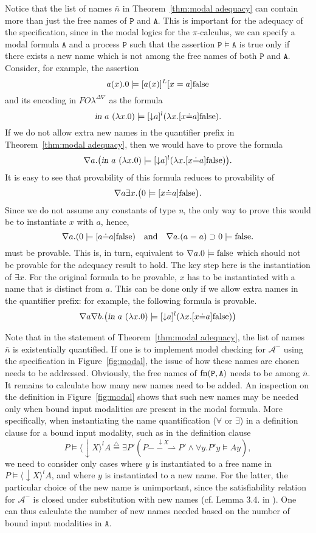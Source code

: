 \documentclass{acmtrans2m}
\def \mFalse {\hbox{false}}
\newcommand \mBox[1] {[#1]}
\newcommand \stf[2] {#1 \models #2}
\newcommand \matchBox[3] {[#1 \dot = #2] #3}
\newcommand \inBoxL[2] {[\inact\! #1]^l #2}
\newcommand \inDiaL[2] {\langle \inact\! #1 \rangle^l #2}
\def\Ascr{{\mathcal A}}
\def\Api{{\mathtt A}}
\def\Ppi{{\mathtt P}}
\newcommand{\FOL   }{FO\lambda}
\newcommand{\FOLDNb}{\FOL^{\Delta\nabla}}
\newcommand{\defeq}{\mathrel{\stackrel{{\scriptscriptstyle\triangle}}{=}}}
\newcommand{\inact}{\mathop{\downarrow}}
\newcommand{\inpi}[2]{\hbox{\sl in}~#1~#2}
\newcommand{\name}{\hbox{\sl n}}
\newcommand{\oimp}{\supset}
\newcommand{\onep }[3]{#1\stackrel{#2}{-\!\!-\!\!\!\rightharpoonup} #3}
\newcommand{\fn}[1]{{\rm fn}(#1)}
\begin{document}
Notice that the list of names $\bar n$ in Theorem~\ref{thm:modal adequacy}
can contain more than just the free names of $\Ppi$ and $\Api.$
This is important for the adequacy of the specification, since in the modal
logics for the $\pi$-calculus, we can specify a modal formula $\Api$ and a process 
$\Ppi$ such that the assertion $\Ppi \models \Api$ is true only if 
there exists a new name which is not among the free names of both $\Ppi$
and $\Api$. Consider, for example, the assertion
$$
a(x).0 \models \mBox{a(x)}^L \mBox{x = a} \mFalse
$$
and its encoding in $\FOLDNb$ as the formula
$$
\inpi{a}{(\lambda x.0)} \models \inBoxL a {(\lambda x. \matchBox x a \mFalse)}.
$$
If we do not allow extra new names in the quantifier prefix
in Theorem~\ref{thm:modal adequacy}, then we would have to
prove the formula
$$
\nabla a.\big(\inpi{a}{(\lambda x.0)}\models\inBoxL a{(\lambda x.\matchBox x a\mFalse)}\big).
$$
It is easy to see that provability of this formula reduces to
provability of
$$
\nabla a \exists x.\big(0 \models \matchBox x a \mFalse\big).
$$
Since we do not assume any constants of type \name, the only way to prove
this would be to instantiate $x$ with $a$, hence, 
$$
\nabla a. (0 \models \matchBox a a \mFalse)\hbox{\quad and\quad}
\nabla a. (a = a) \oimp 0 \models \mFalse.
$$
must be provable.  This is, in turn, equivalent to $\nabla a. 0 \models
\mFalse$ which should not be 
provable for the adequacy result to hold. 
The key step here is the instantiation of $\exists x$. For the original formula
to be provable, $x$ has to be instantiated with a name that is
distinct from $a$.  This can be done only if we allow extra names
in the quantifier prefix: for example, the following formula is provable.
$$
\nabla a\nabla b.
  \big(\inpi{a}{(\lambda x.0)} \models \inBoxL a {(\lambda x. \matchBox x a \mFalse)}
  \big)
$$

Note that in the statement of Theorem~\ref{thm:modal adequacy}, the list of names $\bar n$
is existentially quantified. If one is to implement model checking for $\Ascr^-$ using
the specification in Figure~\ref{fig:modal}, the issue of how these names are chosen needs to
be addressed. Obviously, the free names of $\fn{\Ppi,\Api}$ needs to be among $\bar n$.
It remains to calculate how many new names need to be added.
An inspection on the definition in Figure~\ref{fig:modal} shows that such 
new names may be needed only when bound input modalities are present in the modal formula.
More specifically, when instantiating the name quantification ($\forall$ or $\exists$) in 
a definition clause for a bound input modality, such as in the definition clause
$$
\stf P {\inDiaL X A} \defeq \exists P'(\onep{P}{\inact X}{P'} \land \forall y. \stf {P'y} {A y}),
$$
we need to consider only cases where $y$ is instantiated to a free name in $\stf P {\inDiaL X A}$,
and where $y$ is instantiated to a new name. For the latter, the particular choice of the new name 
is unimportant, since the satisfiability relation for $\Ascr^-$ is closed under substitution 
with new names (cf. Lemma 3.4. in \cite{milner93tcs}). 
One can thus calculate the number of new names needed based on the number of bound 
input modalities in $\Api.$
\end{document}
